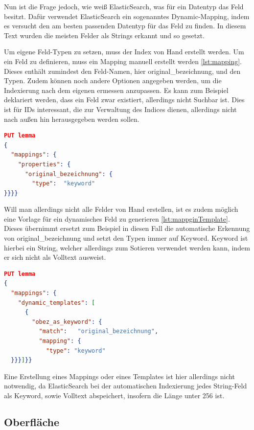 Nun ist die Frage jedoch, wie weiß ElasticSearch, was für ein Datentyp das Feld besitzt. Dafür verwendet ElasticSearch ein sogenanntes Dynamic-Mapping, indem es versucht den am besten passenden Datentyp für das Feld zu finden. In diesem Text wurden die meisten Felder als Strings erkannt und so gesetzt. 

Um eigene Feld-Typen zu setzen, muss der Index von Hand erstellt werden. Um ein Feld zu definieren, muss ein Mapping manuell erstellt werden \ref{lst:mapping}. Dieses enthält zumindest den Feld-Namen, hier original\_bezeichnung, und den Typen. Zudem können noch andere Optionen angegeben werden, um die Indexierung nach dem eigenen ermessen anzupassen. Es kann zum Beispiel deklariert werden, dass ein Feld zwar existiert, allerdings nicht Suchbar ist. Dies ist für IDs interessant, die zur Verwaltung des Indices dienen, allerdings nicht nach außen hin herausgegeben werden sollen.

\begin{lstlisting}[language=json, frame=single, label={lst:mapping}] 
PUT lemma
{
  "mappings": {
    "properties": {
      "original_bezeichnung": {
        "type":  "keyword"
}}}}
\end{lstlisting}

Will man allerdings nicht alle Felder von Hand erstellen, ist es zudem möglich eine Vorlage für ein dynamisches Feld zu generieren \ref{lst:mappginTemplate}. Dieses übernimmt ersetzt zum Beispiel in diesen Fall die automatische Erkennung von original\_bezeichnung und setzt den Typen immer auf Keyword. Keyword ist hierbei ein String, welcher allerdings zum Sotieren verwendet werden kann, indem er sich nicht als Volltext ausweist. 

\begin{lstlisting}[language=json, frame=single, label={lst:mappginTemplate}] 
PUT lemma
{
  "mappings": {
    "dynamic_templates": [
      {
        "obez_as_keyword": {
          "match":   "original_bezeichnung",
          "mapping": {
            "type": "keyword"
  }}}]}}
\end{lstlisting}

Eine Erstellung eines Mappings oder eines Templates ist hier allerdings nicht notwendig, da ElasticSearch bei der automatischen Indexierung jedes String-Feld als Keyword, sowie Volltext abspeichert, insofern die Länge unter 256 ist.

\subsection{Oberfläche}

